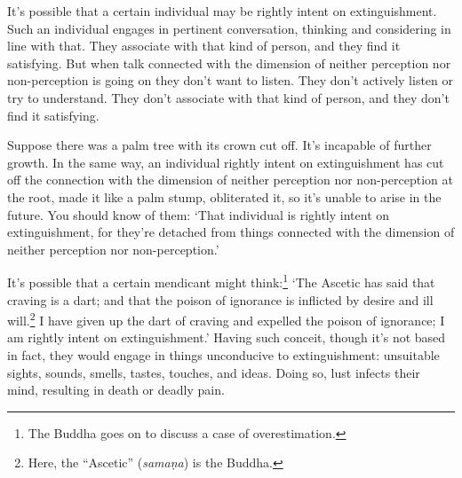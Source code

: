 \documentclass[12pt,openany]{book}%
\begin{document}
It’s possible that a certain individual may be rightly intent on extinguishment. Such an individual engages in pertinent conversation, thinking and considering in line with that. They associate with that kind of person, and they find it satisfying. But when talk connected with the dimension of neither perception nor non-perception is going on they don’t want to listen. They don’t actively listen or try to understand. They don’t associate with that kind of person, and they don’t find it satisfying. 

Suppose there was a palm tree with its crown cut off. It’s incapable of further growth. In the same way, an individual rightly intent on extinguishment has cut off the connection with the dimension of neither perception nor non-perception at the root, made it like a palm stump, obliterated it, so it’s unable to arise in the future. You should know of them: ‘That individual is rightly intent on extinguishment, for they’re detached from things connected with the dimension of neither perception nor non-perception.’ 

It’s possible that a certain mendicant might think:\footnote{The Buddha goes on to discuss a case of overestimation. } ‘The Ascetic has said that craving is a dart; and that the poison of ignorance is inflicted by desire and ill will.\footnote{Here, the “Ascetic” (\textit{\textsanskrit{samaṇa}}) is the Buddha. } I have given up the dart of craving and expelled the poison of ignorance; I am rightly intent on extinguishment.’ Having such conceit, though it’s not based in fact, they would engage in things unconducive to extinguishment: unsuitable sights, sounds, smells, tastes, touches, and ideas. Doing so, lust infects their mind, resulting in death or deadly pain. 
\end{document}
